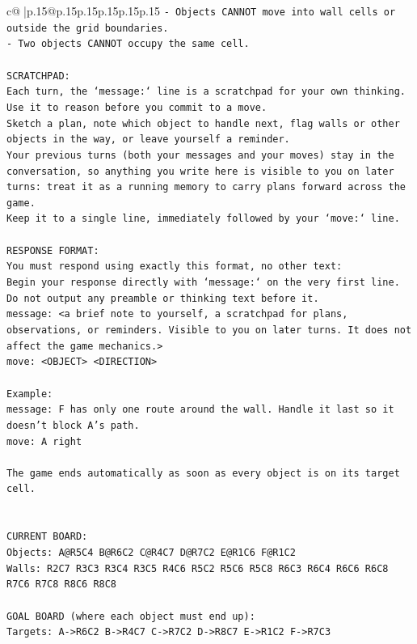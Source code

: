 \documentclass{article}
\begin{document}
{\begin{supertabular}{c@{$\;$}|p{.15\linewidth}@{}p{.15\linewidth}p{.15\linewidth}p{.15\linewidth}p{.15\linewidth}p{.15\linewidth}}
{{{\texttt{{-} Objects CANNOT move into wall cells or outside the grid boundaries.} \\
\texttt{{-} Two objects CANNOT occupy the same cell.} \\
\\ 
\texttt{SCRATCHPAD:} \\
\texttt{Each turn, the `message:` line is a scratchpad for your own thinking. Use it to reason before you commit to a move. } \\
\texttt{Sketch a plan, note which object to handle next, flag walls or other objects in the way, or leave yourself a reminder. } \\
\texttt{Your previous turns (both your messages and your moves) stay in the conversation, so anything you write here is visible to you on later turns: treat it as a running memory to carry plans forward across the game.} \\
\texttt{Keep it to a single line, immediately followed by your `move:` line.} \\
\\ 
\texttt{RESPONSE FORMAT:} \\
\texttt{You must respond using exactly this format, no other text:} \\
\texttt{Begin your response directly with `message:` on the very first line. Do not output any preamble or thinking text before it.} \\
\texttt{message: <a brief note to yourself, a scratchpad for plans, observations, or reminders. Visible to you on later turns. It does not affect the game mechanics.>} \\
\texttt{move: <OBJECT> <DIRECTION>} \\
\\ 
\texttt{Example:} \\
\texttt{message: F has only one route around the wall. Handle it last so it doesn't block A's path.} \\
\texttt{move: A right} \\
\\ 
\texttt{The game ends automatically as soon as every object is on its target cell.} \\
\\ 
\\ 
\texttt{CURRENT BOARD:} \\
\texttt{Objects: A@R5C4 B@R6C2 C@R4C7 D@R7C2 E@R1C6 F@R1C2} \\
\texttt{Walls: R2C7 R3C3 R3C4 R3C5 R4C6 R5C2 R5C6 R5C8 R6C3 R6C4 R6C6 R6C8 R7C6 R7C8 R8C6 R8C8} \\
\\ 
\texttt{GOAL BOARD (where each object must end up):} \\
\texttt{Targets: A{-}>R6C2 B{-}>R4C7 C{-}>R7C2 D{-}>R8C7 E{-}>R1C2 F{-}>R7C3} \\
            }
        }
    }
     \\ \\


\end{supertabular}}
\end{document}
